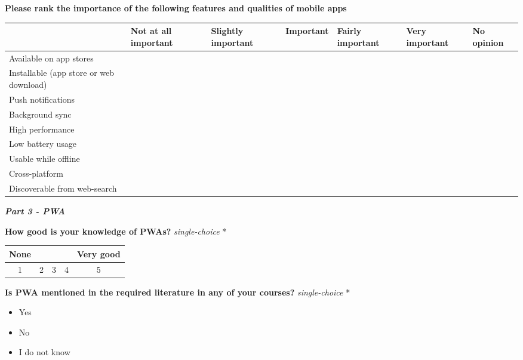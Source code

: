 \documentclass[a4paper,12pt]{article}
\begin{document}
\textbf{Please rank the importance of the following features and qualities of mobile apps}

\begin{tabular}{|p{3cm}|p{1.7cm}|p{1.7cm}|p{1.6cm}|p{1.7cm}|p{1.6cm}|p{1.4cm}|}
  \hline
     & Not at all important  & Slightly important  &  Important & Fairly important  & Very important  & No opinion \\
  \hline
  Available on app stores   &   &   &   &   &   &  \\
  \hline
  Installable (app store or web download)   &   &   &   &   &   & \\
  \hline
   Push notifications  &   &   &   &   &   & \\
  \hline
   Background sync   &   &   &   &   &   & \\
  \hline
   High performance  &   &   &   &   &   & \\
  \hline
   Low battery usage  &   &   &   &   &   & \\
  \hline
   Usable while offline &   &   &   &   &   & \\
  \hline
   Cross-platform  &   &   &   &   &   & \\
  \hline
   Discoverable from web-search  &   &   &   &   &   & \\
  \hline
\end{tabular}

\quad

\quad

\textbf{\textit{Part 3 - PWA}}

\textbf{How good is your knowledge of PWAs?}  \textit{single-choice} *

\begin{tabular}{ccccc}
    None & & & & Very good \\
    \hline
    \multicolumn{1}{|c|}{1} & \multicolumn{1}{c|}{2} & \multicolumn{1}{c|}{3} & \multicolumn{1}{c|}{4} & \multicolumn{1}{c|}{5} \\
     \hline
\end{tabular}

\quad

\quad

\textbf{Is PWA mentioned in the required literature in any of your courses?} \textit{single-choice} *
\begin{itemize}
    \item Yes
    \item No
    \item I do not know
\end{itemize}
\end{document}
